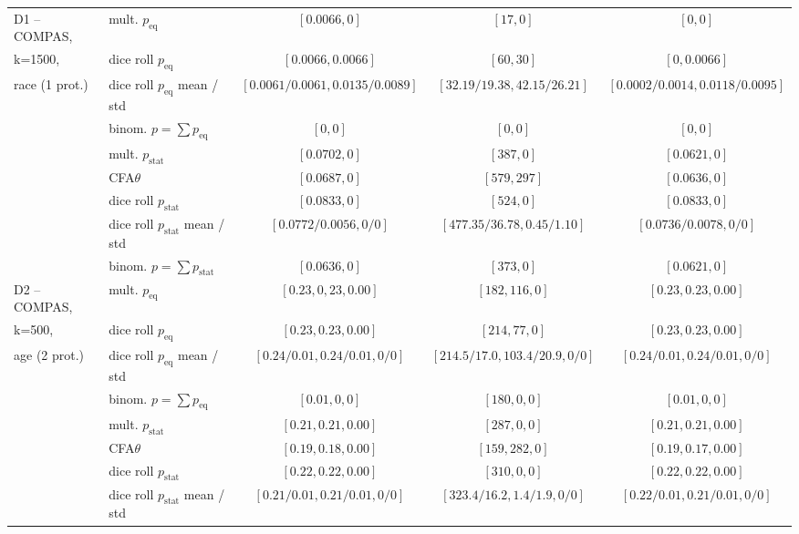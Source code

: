 \begin{table}[t!]
{\begin{tabular}{llccc}
			\midrule
			\midrule
			D1 -- COMPAS,	& mult. \algoFAIR $p_{\text{eq}}$ 	& $[0.0066, 0]$ & $[17, 0]$ 	& $[0, 0]$ \\
			k=1500, 		& dice roll $p_{\text{eq}}$ 	& $[0.0066, 0.0066]$ & $[60, 30]$ 	& $[0, 0.0066]$ \\
			race (1 prot.)	& dice roll $p_{\text{eq}}$ mean / std	& $[0.0061 / 0.0061, 0.0135 / 0.0089]$ & $[32.19 / 19.38, 42.15 / 26.21]$ 	& $[0.0002 / 0.0014, 0.0118 / 0.0095]$ \\
			& binom. \algoFAIR
$p=\sum p_{\text{eq}}$ 	& $[0, 0]$ & $[0, 0]$ 	& $[0,0]$ \\
							\cline{2-5}
			& mult. \algoFAIR  $p_{\text{stat}}$ 	& $[0.0702, 0]$ & $[387, 0]$ 	& $[0.0621,0]$ \\
							& CFA$\theta$ 					& $[0.0687, 0]$ & $[579, 297]$ 	& $[0.0636, 0]$ \\
							& dice roll $p_{\text{stat}}$ 	& $[0.0833, 0]$ & $[524, 0]$ 	& $[0.0833, 0]$ \\
							& dice roll $p_{\text{stat}}$ mean / std	& $[0.0772 / 0.0056, 0 / 0]$ & $[477.35 / 36.78, 0.45 / 1.10]$ 	& $[0.0736 / 0.0078, 0 / 0]$ \\
			& binom. \algoFAIR
$p=\sum p_{\text{stat}}$ 	& $[0.0636, 0]$ & $[373, 0]$ 	& $[0.0621,0]$ \\
			\midrule
			\midrule
			D2 -- COMPAS, 	& mult. \algoFAIR $p_{\text{eq}}$ 	& $[0.23, 0,23, 0.00]$ & $[182, 116, 0]$ 	& $[0.23, 0.23, 0.00]$ \\
			k=500, 			& dice roll $p_{\text{eq}}$ 	& $[0.23, 0.23, 0.00]$ & $[214, 77, 0]$ 	& $[0.23, 0.23, 0.00]$ \\
			age (2 prot.)	& dice roll $p_{\text{eq}}$ mean / std	& $[0.24 / 0.01, 0.24 / 0.01, 0 / 0]$ & $[214.5 / 17.0, 103.4 / 20.9, 0 / 0]$ 	& $[0.24 / 0.01, 0.24 / 0.01, 0 / 0]$ \\
							& binom. \algoFAIR $p = \sum p_{\text{eq}}$	& $[0.01,0,0]$	& $[180,0,0]$		& $[0.01,0,0]$  \\
							\cline{2-5}
							& mult. \algoFAIR $p_{\text{stat}}$ 	& $[0.21, 0.21, 0.00]$ & $[287, 0, 0]$ 		& $[0.21, 0.21, 0.00]$ \\
							& CFA$\theta$ 					& $[0.19, 0.18 ,0.00]$ & $[159, 282, 0]$ 	& $[0.19, 0.17, 0.00]$ \\ %
							& dice roll $p_{\text{stat}}$ 	& $[0.22, 0.22, 0.00]$ & $[310, 0, 0]$ 		& $[0.22, 0.22, 0.00]$ \\
							& dice roll $p_{\text{stat}}$ mean / std	& $[0.21 / 0.01, 0.21 / 0.01, 0 / 0]$ & $[323.4 / 16.2, 1.4 / 1.9, 0 / 0]$ 		& $[0.22 / 0.01, 0.21 / 0.01, 0 / 0]$ \\

\end{tabular}}
\end{table}

